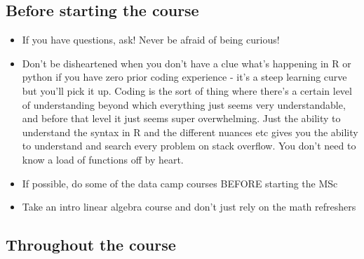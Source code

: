 \documentclass[
]{book}
\providecommand{\tightlist}{%
  \setlength{\itemsep}{0pt}\setlength{\parskip}{0pt}}
\begin{document}
\subsection{Before starting the course}\label{before-starting-the-course}

\begin{itemize}
\tightlist
\item
  If you have questions, ask! Never be afraid of being curious!
\item
  Don't be disheartened when you don't have a clue what's happening in R or python if you have zero prior coding experience - it's a steep learning curve but you'll pick it up. Coding is the sort of thing where there's a certain level of understanding beyond which everything just seems very understandable, and before that level it just seems super overwhelming. Just the ability to understand the syntax in R and the different nuances etc gives you the ability to understand and search every problem on stack overflow. You don't need to know a load of functions off by heart.
\item
  If possible, do some of the data camp courses BEFORE starting the MSc
\item
  Take an intro linear algebra course and don't just rely on the math refreshers
\end{itemize}

\subsection{Throughout the course}\label{throughout-the-course}
\end{document}
